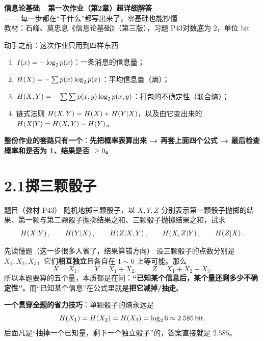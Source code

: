 \documentclass[11pt,a4paper]{ctexart}
\begin{document}
\begin{center}
{\LARGE\bfseries 信息论基础\ \ 第一次作业（第2章）超详细解答}\\[8pt]
{\large —— 每一步都在“干什么”都写出来了，零基础也能抄懂}\\[8pt]
{\small 教材：石峰、莫忠息《信息论基础》（第三版），习题 P43\quad 对数底为 2，单位 bit}
\end{center}

\begin{idea}{动手之前：这次作业只用到四样东西}
\begin{enumerate}[leftmargin=1.6em,itemsep=1pt,topsep=2pt]
  \item $I(x)=-\log_{2} p(x)$：一条消息的信息量；
  \item $H\!\left(X\right)=-\sum p(x)\log_{2} p(x)$：平均信息量（熵）；
  \item $H\!\left(X,Y\right)=-\sum\sum p(x,y)\log_{2} p(x,y)$：打包的不确定性（联合熵）；
  \item 链式法则 $H\!\left(X,Y\right)=H\!\left(X\right)+H\!\left(Y|X\right)$，以及由它变出来的 $H\!\left(X|Y\right)=H\!\left(X,Y\right)-H\!\left(Y\right)$。
\end{enumerate}
\textbf{整份作业的套路只有一个}：\textbf{先把概率表算出来 → 再套上面四个公式 → 最后检查概率和是否为 1、结果是否 $\ge0$。}
\end{idea}

\section{2.1\quad 掷三颗骰子}

\begin{defbox}{题目（教材 P43）}
随机地掷三颗骰子，以 $X,Y,Z$ 分别表示第一颗骰子抛掷的结果、第一颗与第二颗骰子抛掷结果之和、三颗骰子抛掷结果之和，试求
\[
H\!\left(X|Y\right),\qquad H\!\left(Y|X\right),\qquad H\!\left(Z|X,Y\right),\qquad H\!\left(X,Z|Y\right),\qquad H\!\left(Z|X\right).
\]
\end{defbox}

\begin{idea}{先读懂题（这一步很多人省了，结果算错方向）}
设三颗骰子的点数分别是 $X_1,X_2,X_3$，它们\textbf{相互独立}且各自在 $1\sim6$ 上等可能。那么
\[
X=X_1,\qquad Y=X_1+X_2,\qquad Z=X_1+X_2+X_3 .
\]
所以本题要算的五个量，本质都是在问：\textbf{“已知某个信息后，某个量还剩多少不确定性”}。而“已知某个信息”在公式里就是\textbf{把它减掉/抽走}。

\textbf{一个贯穿全题的省力技巧}：单颗骰子的熵永远是
\[
H\!\left(X_1\right)=H\!\left(X_2\right)=H\!\left(X_3\right)=\log_{2}6\approx2.585\,\text{bit} .
\]
后面凡是“抽掉一个已知量，剩下一个独立骰子”的，答案直接就是 $2.585$。
\end{idea}
\end{document}
